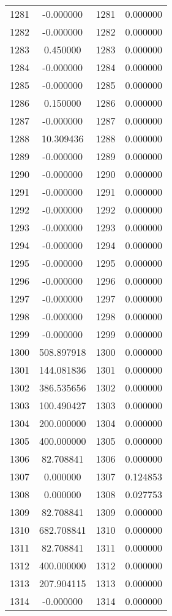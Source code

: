 \documentclass[12pt]{article}
\begin{document}
\begin{longtable}{@{}cccc@{}}
1281 & -0.000000 & 1281 & 0.000000 \\
1282 & -0.000000 & 1282 & 0.000000 \\
1283 & 0.450000 & 1283 & 0.000000 \\
1284 & -0.000000 & 1284 & 0.000000 \\
1285 & -0.000000 & 1285 & 0.000000 \\
1286 & 0.150000 & 1286 & 0.000000 \\
1287 & -0.000000 & 1287 & 0.000000 \\
1288 & 10.309436 & 1288 & 0.000000 \\
1289 & -0.000000 & 1289 & 0.000000 \\
1290 & -0.000000 & 1290 & 0.000000 \\
1291 & -0.000000 & 1291 & 0.000000 \\
1292 & -0.000000 & 1292 & 0.000000 \\
1293 & -0.000000 & 1293 & 0.000000 \\
1294 & -0.000000 & 1294 & 0.000000 \\
1295 & -0.000000 & 1295 & 0.000000 \\
1296 & -0.000000 & 1296 & 0.000000 \\
1297 & -0.000000 & 1297 & 0.000000 \\
1298 & -0.000000 & 1298 & 0.000000 \\
1299 & -0.000000 & 1299 & 0.000000 \\
1300 & 508.897918 & 1300 & 0.000000 \\
1301 & 144.081836 & 1301 & 0.000000 \\
1302 & 386.535656 & 1302 & 0.000000 \\
1303 & 100.490427 & 1303 & 0.000000 \\
1304 & 200.000000 & 1304 & 0.000000 \\
1305 & 400.000000 & 1305 & 0.000000 \\
1306 & 82.708841 & 1306 & 0.000000 \\
1307 & 0.000000 & 1307 & 0.124853 \\
1308 & 0.000000 & 1308 & 0.027753 \\
1309 & 82.708841 & 1309 & 0.000000 \\
1310 & 682.708841 & 1310 & 0.000000 \\
1311 & 82.708841 & 1311 & 0.000000 \\
1312 & 400.000000 & 1312 & 0.000000 \\
1313 & 207.904115 & 1313 & 0.000000 \\
1314 & -0.000000 & 1314 & 0.000000 \\

\end{longtable}
\end{document}
